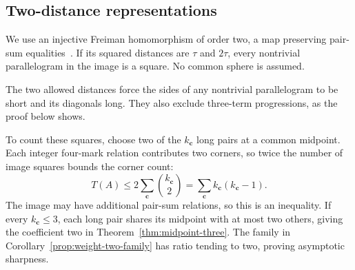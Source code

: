 \documentclass[11pt,a4paper]{article}
\newif\ifshowrevisions
\newenvironment{revision}{\par\begingroup\ifshowrevisions\color{red}\fi}{\par\endgroup}
\theoremstyle{definition}
\numberwithin{equation}{section}
\begin{document}
\subsection{Two-distance representations}
We use an injective Freiman homomorphism of order two, a map preserving pair-sum equalities~\cite{TV06}. If its squared distances are $\tau$ and $2\tau$, every nontrivial parallelogram in the image is a square. No common sphere is assumed.

\begin{revision}
The two allowed distances force the sides of any nontrivial parallelogram
to be short and its diagonals long. They also exclude three-term
progressions, as the proof below shows.

To count these squares, choose two of the $k_{\mathbf c}$ long pairs at a common midpoint. Each integer four-mark relation contributes two corners, so twice the number of image squares bounds the corner count:
\[
T(A)\le2\sum_{\mathbf c}\binom{k_{\mathbf c}}2
=\sum_{\mathbf c}k_{\mathbf c}(k_{\mathbf c}-1).
\]
The image may have additional pair-sum relations, so this is an inequality. If every $k_{\mathbf c}\le3$, each long pair shares its midpoint with at most two others, giving the coefficient two in Theorem~\ref{thm:midpoint-three}. The family in Corollary~\ref{prop:weight-two-family} has ratio tending to two, proving asymptotic sharpness.
\end{revision}
\end{document}
